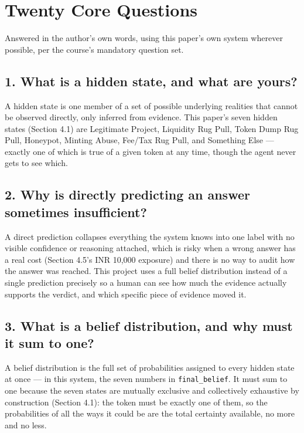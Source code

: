 \documentclass[11pt]{article}
\begin{document}
\appendix

\section{Twenty Core Questions}

Answered in the author's own words, using this paper's own system wherever possible, per the course's mandatory question set.

\subsection*{1. What is a hidden state, and what are yours?}

A hidden state is one member of a set of possible underlying realities that cannot be observed directly, only inferred from evidence. This paper's seven hidden states (Section 4.1) are Legitimate Project, Liquidity Rug Pull, Token Dump Rug Pull, Honeypot, Minting Abuse, Fee/Tax Rug Pull, and Something Else --- exactly one of which is true of a given token at any time, though the agent never gets to see which.

\subsection*{2. Why is directly predicting an answer sometimes insufficient?}

A direct prediction collapses everything the system knows into one label with no visible confidence or reasoning attached, which is risky when a wrong answer has a real cost (Section 4.5's INR 10,000 exposure) and there is no way to audit how the answer was reached. This project uses a full belief distribution instead of a single prediction precisely so a human can see how much the evidence actually supports the verdict, and which specific piece of evidence moved it.

\subsection*{3. What is a belief distribution, and why must it sum to one?}

A belief distribution is the full set of probabilities assigned to every hidden state at once --- in this system, the seven numbers in \texttt{final\_belief}. It must sum to one because the seven states are mutually exclusive and collectively exhaustive by construction (Section 4.1): the token must be exactly one of them, so the probabilities of all the ways it could be are the total certainty available, no more and no less.
\end{document}
